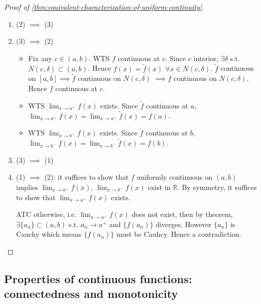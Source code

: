 \begin{proof}[Proof of
    \ref{thm:equivalent-characterization-of-uniform-continuity}
]

    \begin{enumerate}
        \item (2) $\implies$ (3) 
        \item (3) $\implies$ (2) 
        \begin{itemize}
            \item Fix any $c \in (a, b)$. WTS $f$ continuous at $c$.
            \medskip
            Since $c$ interior, $\exists \delta$ s.t. $N(c, \delta) \subset (a,b)$.
            Hence $f(x) = \tilde{f}(x)$ $\forall x \in N(c, \delta)$.
            $\tilde{f}$ continuous on $[a,b] \implies \tilde{f}$ continuous on $N(c, \delta)$
            $\implies f$ continuous on $N(c, \delta)$. Hence $f$ continuous at $c$.
            \item WTS $\lim_{x \to a^+}f(x)$ exists. 
            Since $\tilde{f}$ continuous at 
            $a$, $\lim_{x \to a^+}f(x) = \lim_{x \to a^+}\tilde{f}(x) = f(a)$.
            \item WTS $\lim_{x \to b^-}f(x)$ exists.
            Since $\tilde{f}$ continuous at 
            $b$, $\lim_{x \to b^-}f(x) = \lim_{x \to b^-}\tilde{f}(x) = f(b)$.
        \end{itemize} 
        \item (3) $\implies$ (1) 
        \item (1) $\implies$ (2): it suffices to show that 
        $f$ uniformly continuous on $(a,b)$ implies 
        $\lim_{x \to a^+}f(x)$,
        $\lim_{x \to b^-}f(x)$ exist in $\mathbb{R}$.
        By symmetry, it suffices to show that 
        $\lim_{x \to a^+}f(x)$ exists.
        \medskip 

        ATC otherwise, i.e. $\lim_{x \to a^+}f(x)$ does not exist,
        then by theorem, $\exists \{ a_n \} \subset (a,b)$
        s.t. $a_n \to a^+$
        and $\{ f(a_n) \} $ diverges. 
        However $\{ a_n \} $ is Cauchy which means 
        $\{ f(a_n) \} $ must be Cauhcy. Hence a contradiction.
    \end{enumerate}
\end{proof}


\subsection{
    Properties of continuous functions: connectedness and monotonicity
}

